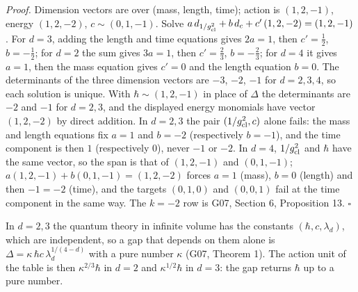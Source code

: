 \documentclass[11pt,a4paper]{article}
\begin{document}
\emph{Proof.} Dimension vectors are over (mass, length, time); action is
\((1,2,-1)\), energy \((1,2,-2)\), \(c\sim(0,1,-1)\). Solve
\(a\,d_{1/g_{\rm cl}^2}+b\,d_c+c'\,(1,2,-2)=(1,2,-1)\). For \(d=3\),
adding the length and time equations gives \(2a=1\), then
\(c'=\tfrac12\), \(b=-\tfrac12\); for \(d=2\) the sum gives \(3a=1\),
then \(c'=\tfrac23\), \(b=-\tfrac23\); for \(d=4\) it gives \(a=1\),
then the mass equation gives \(c'=0\) and the length equation \(b=0\).
The determinants of the three dimension vectors are \(-3\), \(-2\),
\(-1\) for \(d=2,3,4\), so each solution is unique. With
\(\hbar\sim(1,2,-1)\) in place of \(\Delta\) the determinants are \(-2\)
and \(-1\) for \(d=2,3\), and the displayed energy monomials have vector
\((1,2,-2)\) by direct addition. In \(d=2,3\) the pair
\((1/g_{\rm cl}^2,c)\) alone fails: the mass and length equations fix
\(a=1\) and \(b=-2\) (respectively \(b=-1\)), and the time component is
then \(1\) (respectively \(0\)), never \(-1\) or \(-2\). In \(d=4\),
\(1/g_{\rm cl}^2\) and \(\hbar\) have the same vector, so the span is
that of \((1,2,-1)\) and \((0,1,-1)\); \(a(1,2,-1)+b(0,1,-1)=(1,2,-2)\)
forces \(a=1\) (mass), \(b=0\) (length) and then \(-1=-2\) (time), and
the targets \((0,1,0)\) and \((0,0,1)\) fail at the time component in
the same way. The \(k=-2\) row is G07, Section 6, Proposition 13.
\(\square\)

In \(d=2,3\) the quantum theory in infinite volume has the constants
\((\hbar,c,\lambda_d)\), which are independent, so a gap that depends on
them alone is \(\Delta=\kappa\,\hbar c\,\lambda_d^{1/(4-d)}\) with a
pure number \(\kappa\) (G07, Theorem 1). The action unit of the table is
then \(\kappa^{2/3}\hbar\) in \(d=2\) and \(\kappa^{1/2}\hbar\) in
\(d=3\): the gap returns \(\hbar\) up to a pure number.
\end{document}
